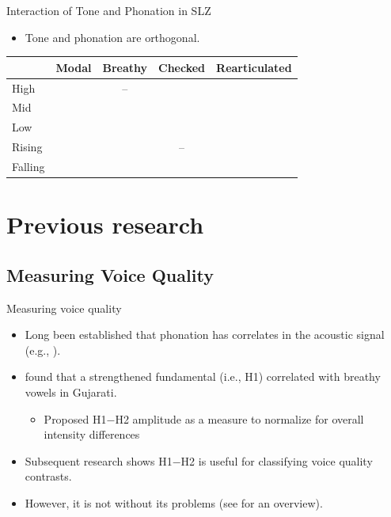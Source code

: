 \documentclass[professionalfonts]{beamer}
\providecommand{\lsptoprule}{\midrule\toprule}
\providecommand{\lspbottomrule}{\bottomrule\midrule}
\newcommand{\cmark}{\ding{51}}%
\begin{document}
\begin{frame}{Interaction of Tone and Phonation in SLZ}
  \begin{itemize}
    \item Tone and phonation are orthogonal.
  \end{itemize}
  \begin{center}
    \begin{tabular}{lcccc}
      \lsptoprule
      & \textbf{Modal} & \textbf{Breathy} & \textbf{Checked} & \textbf{Rearticulated} \\
      \midrule
      High    & \cmark & -- & \cmark & \cmark \\
      Mid     & \cmark & \cmark & \cmark & \cmark \\
      Low     & \cmark & \cmark & \cmark & \cmark \\
      Rising  & \cmark & \cmark & -- & \cmark \\
      Falling & \cmark & \cmark & \cmark & \cmark \\
      \lspbottomrule
    \end{tabular}
  \end{center}
\end{frame}

\section{Previous research}
\subsection{Measuring Voice Quality}

\begin{frame}{Measuring voice quality}
  \begin{itemize}
    \item Long been established that phonation has correlates in the acoustic signal (e.g., \cite{fischer-jorgensenPhoneticAnalysisBreathy1968,klattAnalysisSynthesisPerception1990}).
    \item \citet{fischer-jorgensenPhoneticAnalysisBreathy1968} found that a strengthened fundamental (i.e., H1) correlated with breathy vowels in Gujarati.
    \begin{itemize}
      \item Proposed H1$-$H2 amplitude as a measure to normalize for overall intensity differences
    \end{itemize}
    \item Subsequent research shows H1$-$H2 is useful for classifying voice quality contrasts.  
    \item However, it is not without its problems (see \cite{chaiH1H2AcousticMeasure2022} for an overview).
  \end{itemize}
\end{frame}
\end{document}
